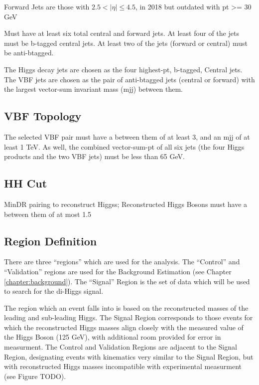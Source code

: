         Forward Jets are those with $ 2.5 < |\eta| \leq 4.5 $, in 2018 but outdated
            with pt >= 30 GeV %

        Must have at least six total central and forward jets.
        At least four of the jets must be b-tagged central jets.
        At least two of the jets (forward or central) must be anti-btagged.

        The Higgs decay jets are chosen as the four highest-pt, b-tagged, Central jets.
        The VBF jets are chosen as the pair of anti-btagged jets (central or forward)
            with the largest vector-sum invariant mass (mjj) between them. %


    \subsection{VBF Topology}
        
        The selected VBF pair must have a \deta between them of at least 3, %
            and an mjj of at least 1 TeV. %
        As well, the combined vector-sum-pt of all six jets
            (the four Higgs products and the two VBF jets)
            must be less than 65 GeV. %


    \subsection{HH \deta Cut}

        MinDR pairing to reconstruct Higgss; %
        Reconstructed Higgs Bosons must have a \deta between them of at most 1.5 %


    \subsection{Region Definition}
        
        There are three ``regions'' which are used for the analysis.
        The ``Control'' and ``Validation'' regions are used for the Background Estimation (see Chapter \ref{chapter:background}).
        The ``Signal'' Region is the set of data which will be used to search for the di-Higgs signal.

        The region which an event falls into is based on the reconstructed masses of the leading and sub-leading Higgs.
        The Signal Region corresponds to those events for which the reconstructed Higgs masses
            align closely with the measured value of the Higgs Boson (125 GeV), with additional room provided for error in measurment.
        The Control and Validation Regions are adjacent to the Signal Region,
            designating events with kinematics very similar to the Signal Region,
            but with reconstructed Higgs masses incompatible with experimental measurment (see Figure TODO).



